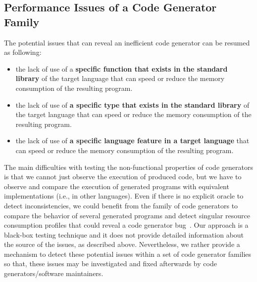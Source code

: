 \subsection{Performance Issues of a Code Generator Family}

The potential issues that can reveal an inefficient code generator can be resumed as following:
\begin{itemize}
	\setlength\itemsep{0em}
	\item  the lack of use of a \textbf{specific function that exists in the standard library} of the target language  that can speed or reduce the memory consumption of the resulting program.
	\item the lack of use of \textbf{a specific type that exists in the standard library} of the target language  that can speed or reduce the memory consumption of the resulting program.
	\item  the lack of use of\textbf{ a specific language feature in a target language}  that can speed or reduce the memory consumption of the resulting program. 
\end{itemize}


The main difficulties with testing the non-functional properties of code generators is that we cannot just observe the execution of produced code, but we have to observe and compare the execution of generated programs with equivalent implementations (i.e., in other languages). Even if there is no explicit oracle to detect inconsistencies, we could benefit from the family of code generators to compare the behavior of several generated programs and detect singular resource consumption profiles that could reveal a code generator bug~\cite{hundt2011loop}. 
Our approach is a black-box testing technique and it does not provide detailed information about the source of the issues, as described above. Nevertheless, we rather provide a mechanism to detect these potential issues within a set of code generator families so that, these issues may be investigated and fixed afterwards by code generators/software maintainers.

